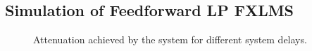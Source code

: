 \subsection{Simulation of Feedforward LP FXLMS}
\begin{figure}[H]
	\centering
	
	\caption{Attenuation achieved by the system for different system delays.}
	\label{Fig:Reference to noise ratio}
\end{figure}














